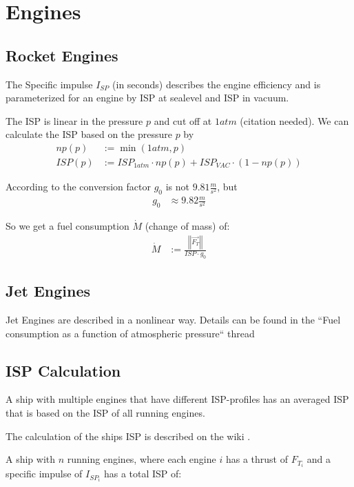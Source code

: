 \documentclass[11pt]{report}
\newcommand{\oa}[1]{\overrightarrow{#1}}
\newcommand{\isp}{I_{SP}}
\newcommand{\ispi}[1]{I_{SP_{#1}}}
\newcommand{\absvec}[1]{\left|\left|{#1}\right|\right|}
\begin{document}
\section{Engines}

\subsection{Rocket Engines}

The  Specific impulse $\isp$ (in seconds) describes the
engine efficiency and is parameterized for an engine by ISP at
sealevel and ISP in vacuum.

The ISP is linear in the pressure $p$ and cut off at $1atm$
(citation needed).  We can calculate the ISP based on the pressure
$p$ by
\begin{align}
  np(p) &:= \min(1 atm, p)\\
  ISP(p) &:= ISP_{1atm} \cdot np(p) + ISP_{VAC} \cdot (1-np(p))
\end{align}

According to \cite{ECF} the conversion factor $g_0$ is not
$9.81\frac{m}{s^2}$, but
\begin{align}
  g_0 &\approx 9.82\frac{m}{s^2}
\end{align}

So we get a fuel consumption $\dot{M}$ (change of mass) \cite{SPI} of:
\begin{align}
\dot{M} & := \frac{\absvec{\oa{F_T}}}{ISP \cdot g_0}\label{FuelConsumptionEquation}
\end{align}

\subsection{Jet Engines}

Jet Engines are described in a nonlinear way. Details can be found in
the ``Fuel consumption as a function of atmospheric pressure`` thread
\cite{JetEngines}

\subsection{ISP Calculation}

A ship with multiple engines that have different ISP-profiles has an
averaged ISP that is based on the ISP of all running engines.

The calculation of the ships ISP is described on the wiki
\cite{MulEng}.

A ship with $n$ running engines, where each engine $i$ has a thrust of
$F_{T_i}$ and a specific impulse of $\ispi{i}$ has a total ISP of:
\end{document}
